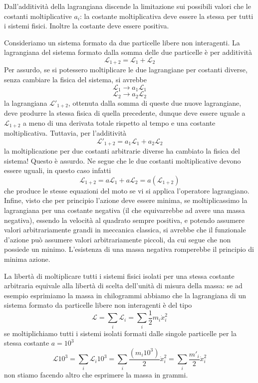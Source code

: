 \documentclass[
10pt, %
a4paper, %
oneside, %
headinclude,footinclude, %
BCOR5mm, %
]{scrartcl}
\begin{document}
\begin{teorema}
	Dall'additività della lagrangiana discende la limitazione sui possibili valori che le costanti moltiplicative \(a_i\): la costante moltiplicativa deve essere la stessa per tutti i sistemi fisici. Inoltre la costante deve essere positiva.
	
\end{teorema}
\begin{dimostrazione}
	Consideriamo un sistema formato da due particelle libere non interagenti. La lagrangiana del sistema formato dalla somma delle due particelle è per additività
	\[\mathcal{L}_{1+2} = \mathcal{L}_1+\mathcal{L}_2\]
	Per assurdo, se si potessero moltiplicare le due lagrangiane per costanti diverse, senza cambiare la fisica del sistema, si avrebbe
	\[\mathcal{L}_1\rightarrow a_1 \mathcal{L}_1\]
	\[\mathcal{L}_2\rightarrow a_2 \mathcal{L}_2\]
	la lagrangiana \(\mathcal{L}'_{1+2}\), ottenuta dalla somma di queste due nuove lagrangiane, deve produrre la stessa fisica di quella precedente, dunque deve essere uguale a \(\mathcal{L}_{1+2}\) a meno di una derivata totale rispetto al tempo e una costante moltiplicativa. Tuttavia, per l'additività 
	\[\mathcal{L}'_{1+2} = a_1\mathcal{L}_1+a_2\mathcal{L}_2\]
	la moltiplicazione per due costanti arbitrarie diverse ha cambiato la fisica del sistema! Questo è assurdo. Ne segue che le due costanti moltiplicative devono essere uguali, in questo caso infatti
	\[\mathcal{L}_{1+2} = a\mathcal{L}_1+a\mathcal{L}_2 = a(\mathcal{L}_{1+2})\] 
	che produce le stesse equazioni del moto se vi si applica l'operatore lagrangiano. \\
	Infine, visto che per principio l'azione deve essere minima, se moltiplicassimo la lagrangiana per una costante negativa (il che equivarrebbe ad avere una massa negativa), essendo la velocità al quadrato sempre positiva, e potendo assumere valori arbitrariamente grandi in meccanica classica, si avrebbe che il funzionale d'azione può assumere valori arbitrariamente piccoli, da cui segue che non possiede un minimo. L'esistenza di una massa negativa romperebbe il principio di minima azione. 
\end{dimostrazione}
\begin{osservazione}
	La libertà di moltiplicare tutti i sistemi fisici isolati per una stessa costante arbitraria equivale alla libertà di scelta dell'unità di misura della massa: se ad esempio esprimiamo la massa in chilogrammi abbiamo che la lagrangiana di un sistema formato da particelle libere non interagenti è del tipo
	\[\mathcal{L} = \sum_i\mathcal{L}_i = \sum_i\frac{1}{2}m_i\dot{x}_i^2\]
	se moltiplichiamo tutti i sistemi isolati formati dalle singole particelle per la stessa costante \(a = 10^{3}\) 
	\[\mathcal{L}10^{3} = \sum_i\mathcal{L}_i10^{3} = \sum_i\frac{(m_i10^{3})}{2}\dot{x}_i^2 = \sum_i\frac{m'_i}{2}\dot{x}_i^2\]
	non stiamo facendo altro che esprimere la massa in grammi.
\end{osservazione}
\end{document}
